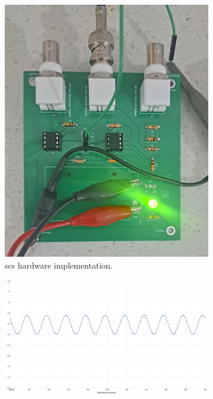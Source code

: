 \documentclass[class=report,11pt,crop=false]{standalone}
\begin{document}
	\begin{figure}[h!]
		\centering
		\begin{subfigure}{.32\textwidth}
			\centering
			\includegraphics[width=0.95\linewidth]{Figures/Results/scs-hardware}
			\caption{\acrshort{scs} hardware implementation.}
			\label{fig:scs-hardware}
		\end{subfigure}%
		\begin{subfigure}{.32\textwidth}
			\centering
			\includegraphics[width=0.95\linewidth]{Figures/Results/scs-output-02Vpp-10kHz}

\end{subfigure}
\end{figure}
\end{document}
